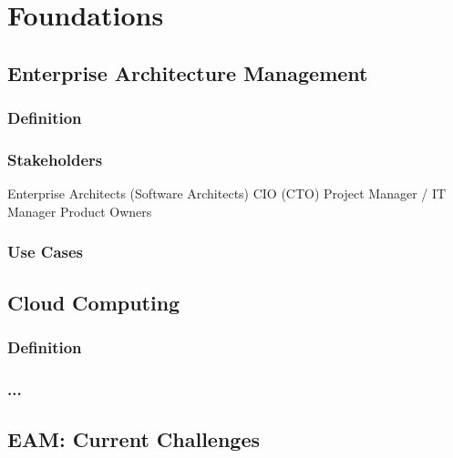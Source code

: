 
\chapter{Foundations}\label{chapter:foundations}
\section{Enterprise Architecture Management} 

\subsection{Definition}

\subsection{Stakeholders}
Enterprise Architects (Software Architects)
CIO (CTO)
Project Manager / IT Manager
Product Owners

\subsection{Use Cases}


\section{Cloud Computing} 

\subsection{Definition}


\subsection{...}

\section{EAM: Current Challenges} 


